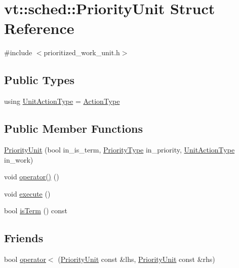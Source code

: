 \hypertarget{structvt_1_1sched_1_1_priority_unit}{}\section{vt\+:\+:sched\+:\+:Priority\+Unit Struct Reference}
\label{structvt_1_1sched_1_1_priority_unit}


{\ttfamily \#include $<$prioritized\+\_\+work\+\_\+unit.\+h$>$}

\subsection*{Public Types}
\begin{DoxyCompactItemize}
\item 
using \hyperlink{structvt_1_1sched_1_1_priority_unit_aadc2c7160cb86f45260dbdd2d39b1b68}{Unit\+Action\+Type} = \hyperlink{namespacevt_ae0a5a7b18cc99d7b732cb4d44f46b0f3}{Action\+Type}
\end{DoxyCompactItemize}
\subsection*{Public Member Functions}
\begin{DoxyCompactItemize}
\item 
\hyperlink{structvt_1_1sched_1_1_priority_unit_ae0f822497e235515829b196c0a78d07f}{Priority\+Unit} (bool in\+\_\+is\+\_\+term, \hyperlink{namespacevt_a86bff9f556eb761b27fc8600d006ac04}{Priority\+Type} in\+\_\+priority, \hyperlink{structvt_1_1sched_1_1_priority_unit_aadc2c7160cb86f45260dbdd2d39b1b68}{Unit\+Action\+Type} in\+\_\+work)
\item 
void \hyperlink{structvt_1_1sched_1_1_priority_unit_a40a55799751087271c193a493ac57e6c}{operator()} ()
\item 
void \hyperlink{structvt_1_1sched_1_1_priority_unit_a0304a73083bac18a1a4fed9aa29a9efa}{execute} ()
\item 
bool \hyperlink{structvt_1_1sched_1_1_priority_unit_aa09abddcc94303d6d8e7efae5fb76173}{is\+Term} () const
\end{DoxyCompactItemize}
\subsection*{Friends}
\begin{DoxyCompactItemize}
\item 
bool \hyperlink{structvt_1_1sched_1_1_priority_unit_acb3ebd4c059caed604579a0bbfb8b0e8}{operator$<$} (\hyperlink{structvt_1_1sched_1_1_priority_unit}{Priority\+Unit} const \&lhs, \hyperlink{structvt_1_1sched_1_1_priority_unit}{Priority\+Unit} const \&rhs)
\end{DoxyCompactItemize}


